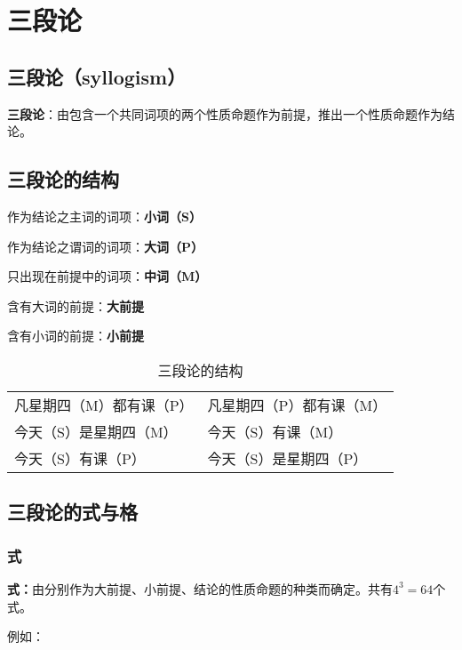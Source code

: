 \documentclass[12pt,onecolumn,a4paper]{book}
\numberwithin{table}{subsection}
\numberwithin{equation}{subsection}
\begin{document}
\section{三段论}

\subsection{三段论（syllogism）}

\textbf{三段论}：由包含一个共同词项的两个性质命题作为前提，推出一个性质命题作为结论。

\subsection{三段论的结构}

作为结论之主词的词项：\textbf{小词（S）}

作为结论之谓词的词项：\textbf{大词（P）}

只出现在前提中的词项：\textbf{中词（M）}

含有大词的前提：\textbf{大前提}

含有小词的前提：\textbf{小前提}

\begin{table}[h]
\begin{center}
    \begin{tabular}{l|l}
    凡星期四（M）都有课（P）&凡星期四（P）都有课（M）\\
    今天（S）是星期四（M）&今天（S）有课（M）\\
    \hdashline
    今天（S）有课（P）&今天（S）是星期四（P）\\
    \end{tabular}
    \caption{三段论的结构}
\end{center}
\end{table}

\subsection{三段论的式与格}

\subsubsection{式}
\textbf{式：}由分别作为大前提、小前提、结论的性质命题的种类而确定。共有$4^3=64$个式。

例如：
\end{document}
